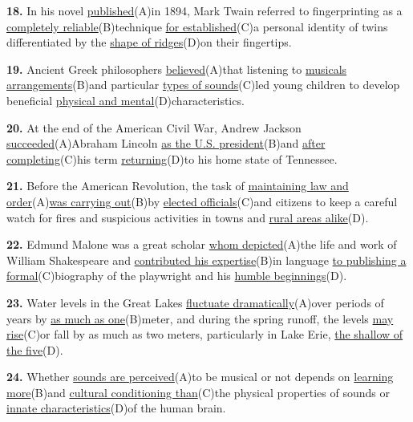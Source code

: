 \documentclass[12pt]{article}
\begin{document}
\noindent\textbf{18.} In his novel \uline{published}(A)in 1894, Mark Twain referred to fingerprinting as a \uline{completely reliable}(B)technique \uline{for established}(C)a personal identity of twins differentiated by the \uline{shape of ridges}(D)on their fingertips.
\par
\vspace{\questionblockgap}
\noindent\textbf{19.} Ancient Greek philosophers \uline{believed}(A)that listening to \uline{musicals arrangements}(B)and particular \uline{types of sounds}(C)led young children to develop beneficial \uline{physical and mental}(D)characteristics.
\par
\vspace{\questionblockgap}
\noindent\textbf{20.} At the end of the American Civil War, Andrew Jackson \uline{succeeded}(A)Abraham Lincoln \uline{as the U.S. president}(B)and \uline{after completing}(C)his term \uline{returning}(D)to his home state of Tennessee.
\par
\vspace{\questionblockgap}
\noindent\textbf{21.} Before the American Revolution, the task of \uline{maintaining law and order}(A)\uline{was carrying out}(B)by \uline{elected officials}(C)and citizens to keep a careful watch for fires and suspicious activities in towns and \uline{rural areas alike}(D).
\par
\vspace{\questionblockgap}
\noindent\textbf{22.} Edmund Malone was a great scholar \uline{whom depicted}(A)the life and work of William Shakespeare and \uline{contributed his expertise}(B)in language \uline{to publishing a formal}(C)biography of the playwright and his \uline{humble beginnings}(D).
\par
\vspace{\questionblockgap}
\noindent\textbf{23.} Water levels in the Great Lakes \uline{fluctuate dramatically}(A)over periods of years by \uline{as much as one}(B)meter, and during the spring runoff, the levels \uline{may rise}(C)or fall by as much as two meters, particularly in Lake Erie, \uline{the shallow of the five}(D).
\par
\vspace{\questionblockgap}
\noindent\textbf{24.} Whether \uline{sounds are perceived}(A)to be musical or not depends on \uline{learning more}(B)and \uline{cultural conditioning than}(C)the physical properties of sounds or \uline{innate characteristics}(D)of the human brain.
\par
\vspace{\questionblockgap}
\end{document}
